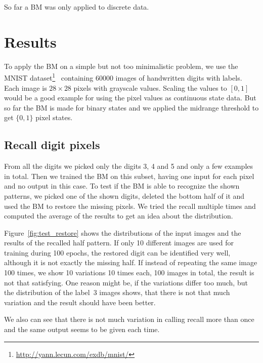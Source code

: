 \documentclass[12pt,twoside]{article}
\theoremstyle{plain}
\theoremstyle{definition}
\theoremstyle{remark}
\begin{document}
So far a BM was only applied to discrete data.


\section{Results}
\label{sec:results}

To apply the BM on a simple but not too minimalistic problem, we use the MNIST dataset\footnote{\url{http://yann.lecun.com/exdb/mnist/}}~\cite{MNIST} containing $60000$ images of handwritten digits with labels. Each image is $28 \times 28$ pixels with grayscale values. Scaling the values to $[0,1]$ would be a good example for using the pixel values as continuous state data. But so far the BM is made for binary states and we applied the midrange threshold to get $\{0, 1\}$ pixel states.

\subsection{Recall digit pixels}

From all the digits we picked only the digits 3, 4 and 5 and only a few examples in total. Then we trained the BM on this subset, having one input for each pixel and no output in this case. To test if the BM is able to recognize the shown patterns, we picked one of the shown digits, deleted the bottom half of it and used the BM to restore the missing pixels. We tried the recall multiple times and computed the average of the results to get an idea about the distribution.

Figure~\ref{fig:test_restore} shows the distributions of the input images and the results of the recalled half pattern. If only 10 different images are used for training during 100 epochs, the restored digit can be identified very well, although it is not exactly the missing half. If instead of repeating the same image 100 times, we show 10 variations 10 times each, 100 images in total, the result is not that satisfying. One reason might be, if the variations differ too much, but the distribution of the label~3 images shows, that there is not that much variation and the result should have been better.

We also can see that there is not much variation in calling recall more than once and the same output seems to be given each time. 
\end{document}
